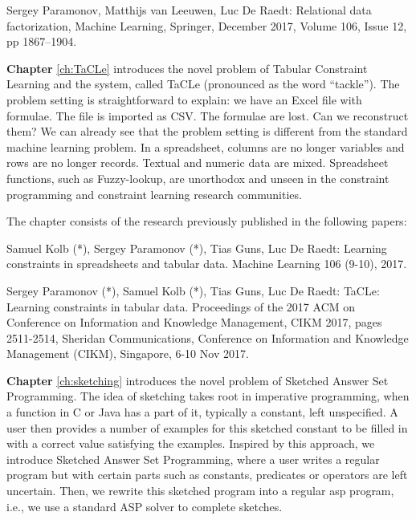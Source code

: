 \begin{addmargin}[2em]{2em}

Sergey Paramonov,  Matthijs van Leeuwen, Luc De Raedt: Relational data
factorization, Machine Learning, Springer, December 2017, Volume 106,
    Issue 12, pp 1867–1904.

\end{addmargin}



\textbf{Chapter} \ref{ch:TaCLe} introduces  the novel problem of
Tabular Constraint Learning and the system, called TaCLe (pronounced
as the word ``tackle''). The problem setting is straightforward to
explain: we have an Excel file with formulae. The file is imported as
CSV. The formulae are lost. Can we reconstruct them? We can already 
see that the problem setting is different from the standard machine
learning problem. In a spreadsheet, columns are no longer variables
and rows are no longer records. Textual and numeric data are mixed.
Spreadsheet functions, such as Fuzzy-lookup, are unorthodox and unseen in
the constraint programming and constraint learning research communities.

The chapter consists of the research previously published in the following papers:

\begin{addmargin}[2em]{2em}
Samuel Kolb (*), Sergey Paramonov (*), Tias Guns, Luc De Raedt:
  Learning constraints in spreadsheets and tabular data. Machine
  Learning 106 (9-10), 2017.


Sergey Paramonov (*), Samuel Kolb (*), Tias Guns, Luc De Raedt:
TaCLe: Learning constraints in tabular data. 
 Proceedings of the 2017 ACM on Conference on Information and
    Knowledge Management, CIKM 2017, pages 2511-2514, Sheridan
    Communications, Conference on Information and Knowledge Management
    (CIKM), Singapore, 6-10 Nov 2017.
\end{addmargin}


\textbf{Chapter} \ref{ch:sketching} introduces the novel problem of
Sketched Answer Set Programming. The idea of sketching takes root in
imperative programming, when a function in C or Java has a part of it,
typically a constant, left unspecified. A user then provides a number
of examples for this sketched constant to be filled in with a
correct value satisfying the examples. Inspired by this approach, we
introduce Sketched Answer Set Programming, where a user writes a
regular program but with certain parts such as constants, predicates
or operators are left uncertain. Then, we rewrite this sketched
program into a regular \acrlong{asp} program, i.e., we use a standard ASP solver
to complete sketches.


